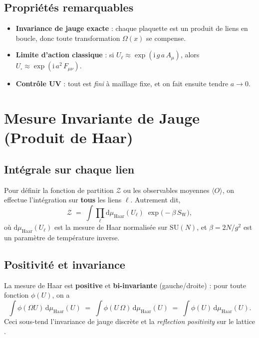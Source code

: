 \subsection*{Propriétés remarquables}
\begin{itemize}
	\item \textbf{Invariance de jauge exacte} : chaque plaquette est un produit de liens en boucle, donc toute transformation \(\Omega(x)\) se compense.  
	\item \textbf{Limite d’action classique} : si \(U_\ell \approx \exp(\mathrm{i}\,g\,a\,A_\mu)\), alors \(U_\square \approx \exp(\mathrm{i}\,a^2\, F_{\mu\nu})\).  
	\item \textbf{Contrôle UV} : tout est \emph{fini} à maillage fixe, et on fait ensuite tendre \(a\to 0\).
\end{itemize}

\vspace{1em}

\section{Mesure Invariante de Jauge (Produit de Haar)}
\label{sec:4.4}

\subsection*{Intégrale sur chaque lien}
Pour définir la fonction de partition \(\mathcal{Z}\) ou les observables moyennes \(\langle O\rangle\), on effectue l’intégration sur \textbf{tous} les liens \(\ell\). Autrement dit,
\[
\mathcal{Z} \;=\; \int \prod_{\ell}\mathrm{d}\mu_{\mathrm{Haar}}(U_\ell)\;\exp\bigl(-\beta\, S_{\mathrm{W}}\bigr),
\]
où \(\mathrm{d}\mu_{\mathrm{Haar}}(U_\ell)\) est la mesure de Haar normalisée sur \(\mathrm{SU}(N)\), et \(\beta = 2N/g^2\) est un paramètre de \og température inverse\fg.

\subsection*{Positivité et invariance}
La mesure de Haar est \textbf{positive} et \textbf{bi-invariante} (gauche/droite) : pour toute fonction \(\phi(U)\), on a
\[
\int \phi(\Omega U)\,\mathrm{d}\mu_{\mathrm{Haar}}(U) \;=\;
\int \phi(U\,\Omega)\,\mathrm{d}\mu_{\mathrm{Haar}}(U) \;=\;
\int \phi(U)\,\mathrm{d}\mu_{\mathrm{Haar}}(U).
\]
Ceci sous-tend l’invariance de jauge discrète et la \emph{reflection positivity} sur le lattice \cite{OsterwalderSeiler1977}.

